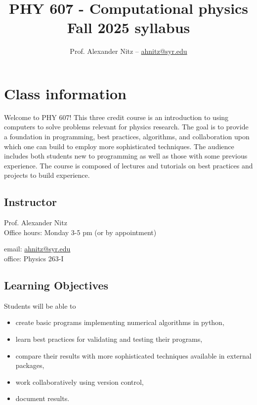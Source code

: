 \documentclass[12pt]{article}
\title{PHY 607 - Computational physics \\ Fall 2025 syllabus}
\author{Prof. Alexander Nitz -- \href{mailto:ahnitz@syr.edu}{ahnitz@syr.edu}}
\date{}
\begin{document}
\maketitle

\section*{Class information}

Welcome to PHY 607! This three credit course is an introduction to using computers to solve problems relevant for physics research. The goal is to provide a foundation in programming, best practices, algorithms, and collaboration upon which one can build to employ more sophisticated techniques. The audience includes both students new to programming as well as those with some previous experience. The course is composed of
lectures and tutorials on best practices and projects to build experience.

\subsection*{Instructor}

\begin{minipage}{0.5\textwidth}
  Prof. Alexander Nitz \\
  Office hours: Monday 3-5 pm (or by appointment)
\end{minipage}
\begin{minipage}{0.5\textwidth}
  \begin{flushright}
  email: \href{mailto:ahnitz@syr.edu}{ahnitz@syr.edu} \\
  office: Physics 263-I
  \end{flushright}
\end{minipage}

\subsection*{Learning Objectives}
Students will be able to
\begin{itemize}
\item create basic programs implementing numerical algorithms in python,
\item learn best practices for validating and testing their programs,
\item compare their results with more sophisticated techniques available in external packages,
\item work collaboratively using version control,
\item document results.
\end{itemize}
\end{document}
